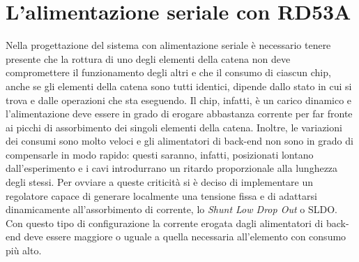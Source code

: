 \section{L'alimentazione seriale con RD53A}

Nella progettazione del sistema con alimentazione seriale è necessario tenere presente che la rottura di uno degli elementi della catena non deve compromettere il funzionamento degli altri e che il consumo di ciascun chip, anche se gli elementi della catena sono tutti identici, dipende dallo stato in cui si trova e dalle operazioni che sta eseguendo. 
Il chip, infatti, è un carico dinamico e l'alimentazione deve essere in grado di erogare abbastanza corrente per far fronte ai picchi di assorbimento dei singoli elementi della catena.
Inoltre, le variazioni dei consumi sono molto veloci e gli alimentatori di back-end non sono in grado di compensarle in modo rapido: questi saranno, infatti, posizionati lontano dall'esperimento e i cavi introdurrano un ritardo proporzionale alla lunghezza degli stessi.
Per ovviare a queste criticità si è deciso di implementare un regolatore capace di generare localmente una tensione fissa e di adattarsi dinamicamente all'assorbimento di corrente, lo \textit{Shunt Low Drop Out} o SLDO.
Con questo tipo di configurazione la corrente erogata dagli alimentatori di back-end deve essere maggiore o uguale a quella necessaria all'elemento con consumo più alto.
